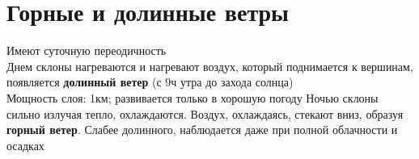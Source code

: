 
\section{Горные и долинные ветры}
Имеют суточную переодичность\\
Днем склоны нагреваются и нагревают воздух, который поднимается к вершинам, появляется \textbf{долинный ветер} (с 9ч утра до захода солнца)\\
Мощность слоя: 1км; развивается только в хорошую погоду
Ночью склоны сильно излучая тепло, охлаждаются. Воздух, охлаждаясь, стекают вниз, образуя \textbf{горный ветер}. Слабее долинного, наблюдается даже при полной облачности и осадках

